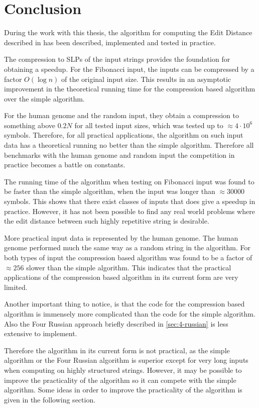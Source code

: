 \documentclass[twoside,11pt,openright]{report}
\begin{document}
\chapter{Conclusion}
\label{chapter:conclusion}
During the work with this thesis, the algorithm for computing the Edit Distance described in \cite{Gawrychowski:2012:FAC:2422024.2422048} has been described, implemented and tested in practice.

The compression to SLPs of the input strings provides the foundation for obtaining a speedup. For the Fibonacci input, the inputs can be compressed by a factor $O(\log{n})$ of the original input size. This results in an asymptotic improvement in the theoretical running time for the compression based algorithm over the simple algorithm.

For the human genome and the random input, they obtain a compression to something above $0.2N$ for all tested input sizes, which was tested up to $\approx 4\cdot 10^6$ symbols. Therefore, for all practical applications, the algorithm on such input data has a theoretical running no better than the simple algorithm. Therefore all benchmarks with the human genome and random input the competition in practice becomes a battle on constants.

The running time of the algorithm when testing on Fibonacci input was found to be faster than the simple algorithm, when the input was longer than $\approx 30000$ symbols. This shows that there exist classes of inputs that does give a speedup in practice. However, it has not been possible to find any real world problems where the edit distance between such highly repetitive string is desirable.

More practical input data is represented by the human genome. The human genome performed much the same way as a random string in the algorithm. For both types of input the compression based algorithm was found to be a factor of $\approx 256$ slower than the simple algorithm. This indicates that the practical applications of the compression based algorithm in its current form are very limited.

Another important thing to notice, is that the code for the compression based algorithm is immensely more complicated than the code for the simple algorithm. Also the Four Russian approach briefly described in \cref{sec:4-russian} is less extensive to implement.

Therefore the algorithm in its current form is not practical, as the simple algorithm or the Four Russian algorithm is superior except for very long inputs when computing on highly structured strings. However, it may be possible to improve the practicality of the algorithm so it can compete with the simple algorithm. Some ideas in order to improve the practicality of the algorithm is given in the following section.
\end{document}
